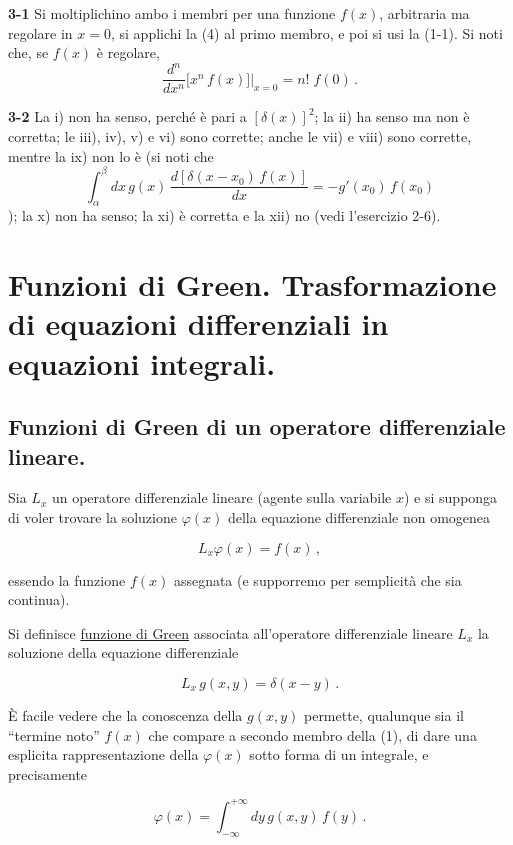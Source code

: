 \documentclass[11pt, a4paper]{book}
\numberwithin{equation}{section}
\begin{document}
\textbf{3-1} \quad Si moltiplichino ambo i membri per una funzione $f(x)$, arbitraria ma regolare in $x=0$, si applichi la (4) al primo membro, e poi si usi la (1-1). Si noti che, se $f(x)$ è regolare,
\[
\frac{d^n}{dx^n}\bigl[x^n\, f(x)\bigr]\bigg|_{x=0} = n!\; f(0) \,.
\]

\textbf{3-2} \quad La i) non ha senso, perché è pari a $[\delta(x)]^2$; la ii) ha senso ma non è corretta; le iii), iv), v) e vi) sono corrette; anche le vii) e viii) sono corrette, mentre la ix) non lo è (si noti che
\[
\int_{\alpha}^{\beta} dx\, g(x)\, \frac{d[\delta(x-x_0)\, f(x)]}{dx} = -g'(x_0)\, f(x_0)
\]
); la x) non ha senso; la xi) è corretta e la xii) no (vedi l'esercizio 2-6).

\chapter{Funzioni di Green. Trasformazione di equazioni differenziali in equazioni integrali.}

\section{Funzioni di Green di un operatore differenziale lineare.}

Sia $L_x$ un operatore differenziale lineare (agente sulla variabile $x$) e si supponga di voler trovare la soluzione $\varphi(x)$ della equazione differenziale non omogenea

\begin{equation}
    L_x \varphi(x) = f(x) \,,
\end{equation}

essendo la funzione $f(x)$ assegnata (e supporremo per semplicità che sia continua).

Si definisce \uline{funzione di Green} associata all'operatore differenziale lineare $L_x$ la soluzione della equazione differenziale

\begin{equation}
    L_x \, g(x,y) = \delta(x-y) \,.
\end{equation}

È facile vedere che la conoscenza della $g(x,y)$ permette, qualunque sia il ``termine noto'' $f(x)$ che compare a secondo membro della (1), di dare una esplicita rappresentazione della $\varphi(x)$ sotto forma di un integrale, e precisamente

\begin{equation}
    \varphi(x) = \int_{-\infty}^{+\infty} dy \, g(x,y) \, f(y) \,.
\end{equation}
\end{document}
